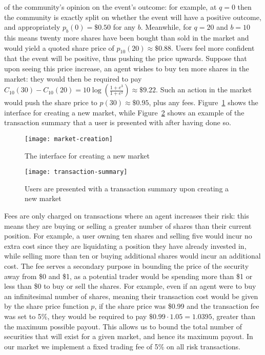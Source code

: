of the community's opinion on the event's outcome: for example, at $q=0$ then
the community is exactly split on whether the event will have a positive
outcome, and appropriately $p_b(0)=\$0.50$ for any $b$. Meanwhile, for $q=20$
and $b=10$ this means twenty more shares have been bought than sold in the
market and would yield a quoted share price of $p_{10}(20) \approx \$0.88$.
Users feel more confident that the event will be positive, thus pushing the
price upwards. Suppose that upon seeing this price increase, an agent wishes to
buy ten more shares in the market: they would then be required to pay
$C_{10}(30)-C_{10}(20)=10 \log (\frac{1+e^3}{1+e^2}) \approx \$9.22$. Such an
action in the market would push the share price to $p(30) \approx \$0.95$, plus
any fees. Figure~\ref{fig:marketCreation} shows the interface for creating a
new market, while Figure~\ref{fig:transactionSummary} shows an example of the
transaction summary that a user is presented with after having done so.

\begin{figure}[h]
	\centering
	\texttt{[image: market-creation]}
	\caption{The interface for creating a new market}
	\label{fig:marketCreation}
\end{figure}

\begin{figure}[h]
	\centering
	\texttt{[image: transaction-summary]}
	\caption{Users are presented with a transaction summary upon creating a new
	market}
	\label{fig:transactionSummary}
\end{figure}

Fees are only charged on transactions where an agent increases their risk: this
means they are buying or selling a greater number of shares than their current
position. For example, a user owning ten shares and selling five would incur no
extra cost since they are liquidating a position they have already invested in,
while selling more than ten or buying additional shares would incur an
additional cost. The fee serves a secondary purpose in bounding the price of
the security away from \$0 and \$1, as a potential trader would be spending
more than \$1 or less than \$0 to buy or sell the shares. For example, even if
an agent were to buy an infinitesimal number of shares, meaning their
transaction cost would be given by the share price function $p$, if the share
price was \$0.99 and the transaction fee was set to 5\%, they would be required
to pay $\$0.99 \cdot 1.05 = 1.0395$, greater than the maximum possible payout.
This allows us to bound the total number of securities that will exist for a
given market, and hence its maximum payout.  In our market we implement a fixed
trading fee of 5\% on all risk transactions.

